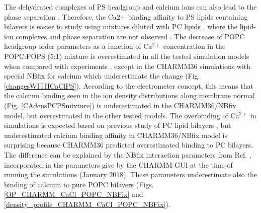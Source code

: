 \documentclass[aps,prl,superscriptaddress,twocolumn]{revtex4}
\begin{document}
The dehydrated complexes of PS headgroup and calcium ions can also lead to the
phase separation \cite{hauser77,kurland79,hauser85,feigenson86,mattai89,roux90,roux91}.
Therefore, the Ca2+ binding affinity to PS lipids containing bilayers is easier
to study using mixtures diluted with PC lipids \cite{roux90,roux91}, where
the lipid-ion complexes and phase separation are not observed \cite{feigenson86,mattai89,roux90,roux91}.
The decrease of POPC headgroup order parameters as a function of Ca$^{2+}$ concentration in the
POPC:POPS (5:1) mixture is overestimated in all the tested simulation models
when compared with experiments \cite{roux90}, except in the CHARMM36 simulations with
special NBfix \cite{kim16} for calcium which underestimate the change (Fig. \ref{changesWITHCaClPS}).
According to the electrometer concept, this means that the calcium binding
seen in the ion density distributions along membrane normal (Fig. \ref{CAdensPCPSmixture})
is underestimated in the CHARMM36/NBfix model, but overestimated in the other tested models.
The overbinding of Ca$^{2+}$ in simulations is expected based on previous study of
PC lipid bilayers \cite{catte16}, but underestimated calcium binding affinity in
CHARMM36/NBfix model is surprising because CHARMM36 predicted overestimated
binding to PC bilayers. The difference can be explained by the NBfix interaction
parameters from Ref. , incorporated in the parameters give by
the CHARMM-GUI at the time of running the simulations (January 2018).
These parameters underestimate also the binding of calcium to pure POPC bilayers
(Figs. \ref{OP_CHARMM_CaCl_POPC_NBFix} and \ref{density_profile_CHARMM_CaCl_POPC_NBFix}).

\end{document}
